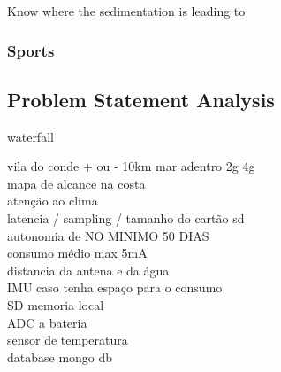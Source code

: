 Know where the sedimentation is leading to
\subsubsection{Sports}

\subsection{Problem Statement Analysis}

waterfall

vila do conde + ou - 10km mar adentro 2g 4g\\
mapa de alcance na costa\\
atenção ao clima \\
latencia / sampling / tamanho do cartão sd\\ 
autonomia de NO MINIMO 50 DIAS \\
consumo médio max 5mA \\
distancia da antena e da água \\
IMU caso tenha espaço para o consumo \\
SD memoria local \\
ADC a bateria \\
sensor de temperatura \\
database mongo db \\
